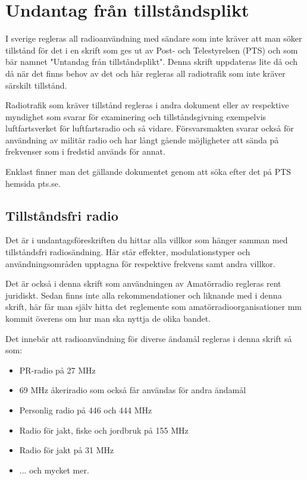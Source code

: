 
\section{Undantag från tillståndsplikt}

I sverige regleras all radioanvändning med sändare som inte kräver att
man söker tillstånd för det i en skrift som ges ut av Post- och
Telestyrelsen (PTS) och som bär namnet "Untandag från
tillståndsplikt". Denna skrift uppdateras lite då och då när det finns
behov av det och här regleras all radiotrafik som inte kräver särskilt
tillstånd.

Radiotrafik som kräver tillstånd regleras i andra dokument eller av
respektive myndighet som svarar för examinering och tillståndsgivning
exempelvis luftfartsverket för luftfartsradio och så vidare.
Försvarsmakten svarar också för användning av militär radio och har
långt gående möjligheter att sända på frekvenser som i fredstid
används för annat.

Enklast finner man det gällande dokumentet genom att söka efter det på
PTS hemsida pts.se.

\subsection{Tillståndsfri radio}

Det är i undantagsföreskriften du hittar alla villkor som hänger
samman med tillståndsfri radiosändning. Här står effekter,
modulationstyper och användningsområden upptagna för respektive
frekvens samt andra villkor.

Det är också i denna skrift som användningen av Amatörradio regleras
rent juridiskt. Sedan finns inte alla rekommendationer och liknande
med i denna skrift, här får man själv hitta det reglemente som
amatörradioorganisationer mm kommit överens om hur man ska nyttja de
olika bandet.

Det innebär att radioanvändning för diverse ändamål regleras i denna
skrift så som:

\begin{itemize}
 \item PR-radio på 27 MHz
 \item 69 MHz åkeriradio som också får användas för andra ändamål
 \item Personlig radio på 446 och 444 MHz
 \item Radio för jakt, fiske och jordbruk på 155 MHz
 \item Radio för jakt på 31 MHz
 \item ... och mycket mer.
\end{itemize}

